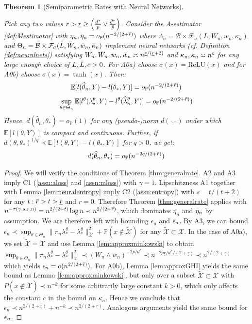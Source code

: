 \documentclass[12pt]{article}
\theoremstyle{myplain}
\newtheorem{theorem}{Theorem}[section]
\theoremstyle{definition}
\theoremstyle{definition}
\theoremstyle{remark}
\numberwithin{equation}{section}
\begin{document}
\begin{theorem}[Semiparametric Rates with Neural Networks]
\begin{itemize}[leftmargin=*]
\end{itemize}
Pick any two values $\Bar r>\underline r\geq \left(\frac{d^*}{p}\vee \frac{\Bar d^*}{\Bar p}\right)$. Consider the A-estimator \ref{def:Mestimator} with $\eta_n, \Bar\eta_n = o_\mathbb{P}(n^{-2/(2+ \Bar r)})$ where $\Lambda_n=\mathcal{B}\times\mathcal{F}_{\sigma}(L, W_n, w_n, \kappa_n)$ and $\Theta_n=\Bar{\mathcal{B}}\times\mathcal{F}_{\sigma}(\Bar L, \Bar W_n, \Bar w_n, \Bar \kappa_n)$ implement neural networks (cf. Definition \ref{def:neuralnets}) satisfying $W_n, \Bar W_n, w_n, \Bar w_n \asymp n^{\underline r/(\underline r+2)}$ and $\kappa_n, \Bar \kappa_n \asymp n^{c}$ for any large enough choice of $L,\Bar L, c>0$. For A0a) choose $\sigma(x)=\mathrm{ReLU}(x)$ and for A0b) choose $\sigma(x)=\tanh(x)$. Then:
\[\mathbb{E}[l(\widehat{\theta}_n, Y)-l(\theta_*, Y)]=o_{\mathbb{P}}(n^{-2/(2+\Bar r)})\]
\[\sup_{\theta\in\Theta_n} \mathbb{E}[l^\theta(\lambda_*^\theta, Y)-l^\theta(\widehat\lambda_n^\theta, Y)]=o_{\mathbb{P}}(n^{-2/(2+\Bar r)})\]
Hence, $d(\widehat\theta_n, \theta_*)=o_\mathbb{P}(1)$ for any (pseudo-)norm $d(\cdot,\cdot)$ under which $\mathbb{E}[l(\theta, Y)]$ is compact and continuous. Further, if $d(\theta, \theta_*)^{1/q}\prec \mathbb{E}[l(\theta, Y)-l(\theta_*,Y)]$ for $q>0$, we get:
$$d(\widehat\theta_n, \theta_*)=o_\mathbb{P}(n^{-2q/(2+\Bar r)})$$
\end{theorem}
\begin{proof}\singlespacing
We will verify the conditions of Theorem \ref{thm:generalrate}. A2 and A3 imply C1 (\ref{assn:aloss} and \ref{assn:mloss}) with $\gamma=1$. Lipschitzness A1 together with Lemma \ref{lem:neuralentropy} imply C2 (\ref{assn:entropy}) with $s=t/(t+2)$ for any $t: \Bar r>t> \underline{r}$ and $r=0$. Therefore Theorem \ref{thm:generalrate} applies with $n^{-\tau(\gamma, s, r, n)}=n^{2/(2+t)}\log n\prec n^{2/(2+\Bar r)}$, which dominates $\eta_n$ and $\Bar{\eta}_n$ by assumption. We are therefore left with bounding $\epsilon_n$ and $\Bar \epsilon_n$. By A3, we can bound $\epsilon_n \prec \sup_{\theta\in\Theta_n} \|\pi_n \lambda_*^\theta-\lambda_*^\theta\|_{\widetilde{{\mathcal{X}}}}^2 + \mathbb{P}(x\not\in\widetilde{{\mathcal{X}}})$ for any $\widetilde{{\mathcal{X}}}\subset {\mathcal{X}}$. In the case of A0a), we set $\widetilde{{\mathcal{X}}}={\mathcal{X}}$ and use Lemma \ref{lem:approxminkowski} to obtain $\sup_{\theta\in\Theta_n} \|\pi_n \lambda_*^\theta-\lambda_*^\theta\|_{\mathcal{X}}^2 \prec (W_n \wedge w_n)^{-2 p/d^*}\prec n^{-2p\underline r/d^*/(2+\underline r)}\prec n^{2/(2+\underline r)}$ which yields $\epsilon_n = o(n^{2/(2+ \Bar r)})$. For A0b), Lemma \ref{lem:approxGHI} yields the same bound as Lemma \ref{lem:approxminkowski}, but only over a subset $\widetilde{{\mathcal{X}}}\subset {\mathcal{X}}$ with $P(x\not\in \widetilde{{\mathcal{X}}})\prec n^{-k}$ for some arbitrarily large constant $k>0$, which only affects the constant $c$ in the bound on $\kappa_n$. Hence we conclude that $\epsilon_n \prec n^{2/(2+ \underline r)} + n^{-k} \prec n^{2/(2+ \underline r)}$. Analogous arguments yield the same bound for $\Bar \epsilon_n$.
\end{proof}\onehalfspacing
\end{document}
